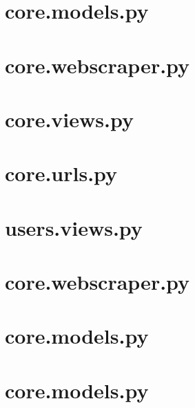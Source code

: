 \section{core.models.py}\label{code:core.models.py}

\section{core.webscraper.py}\label{code:core.webscraper.py}

\section{core.views.py}\label{code:core.views.py}

\section{core.urls.py}\label{code:core.urls.py}

\section{users.views.py}\label{code:users.views.py}

\section{core.webscraper.py}\label{code:core.webscraper.py}



\section{core.models.py}\label{code:static.allmenu_statistics..py}


\section{core.models.py}\label{code:core.models.py}

